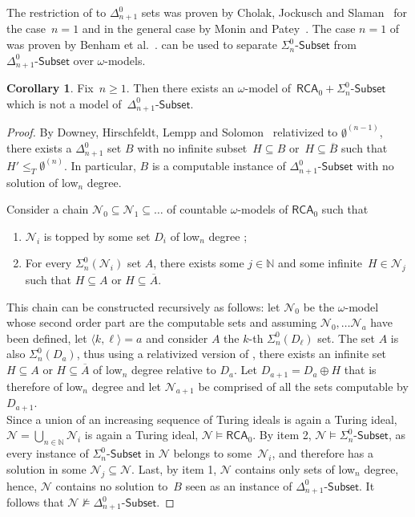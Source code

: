 \documentclass{article}
\def\N{\mathcal{N}}
\def\NN{\mathbb{N}}
\newcommand{\Sub}[1]{{#1}\mbox{-}\mathsf{Subset}}
\newcommand{\RCA}{\mathsf{RCA}}
\numberwithin{theorem}{section}
\theoremstyle{definition}
\newtheorem{corollary}[theorem]{Corollary}
\begin{document}
The restriction of  to $\Delta^0_{n+1}$ sets was proven by Cholak, Jockusch and Slaman~\cite{cholak2001strength} for the case~$n = 1$ and in the general case by Monin and Patey~\cite{monin2021weakness}.
The case $n = 1$ of  was proven by Benham et al.~\cite{benham2024ginsburg}.  can be used to separate $\Sub{\Sigma^0_n}$ from $\Sub{\Delta^0_{n+1}}$ over $\omega$-models.

\begin{corollary}
Fix~$n \geq 1$. Then there exists an $\omega$-model of~$\RCA_0 + \Sub{\Sigma^0_n}$
which is not a model of~$\Sub{\Delta^0_{n+1}}$.
\end{corollary}
\begin{proof}
By Downey, Hirschfeldt, Lempp and Solomon~\cite{downey2001delta2} relativized to $\emptyset^{(n-1)}$,
there exists a $\Delta^0_{n+1}$ set $B$ with no infinite subset~$H \subseteq B$ or~$H \subseteq \overline{B}$ such that $H' \leq_T \emptyset^{(n)}$. In particular, $B$ is a computable instance of $\Sub{\Delta^0_{n+1}}$ with no solution of low${}_n$ degree. 

Consider a chain $\N_0 \subseteq \N_1 \subseteq \dots$ of countable $\omega$-models of $\RCA_0$ such that 
\begin{enumerate} 
    \item $\N_i$ is topped by some set $D_i$ of low${}_n$ degree ; 
    \item For every $\Sigma^0_n(\N_i)$ set $A$, there exists some $j \in \NN$ and some infinite~$H \in \N_j$ such that $H \subseteq A$ or $H \subseteq \overline{A}$.
\end{enumerate}

This chain can be constructed recursively as follows: let $\N_0$ be the $\omega$-model whose second order part are the computable sets and assuming $\N_0, \dots \N_a$ have been defined, let $\langle k,\ell \rangle = a$ and consider $A$ the $k$-th $\Sigma_{n}^0(D_{\ell})$ set. The set $A$ is also $\Sigma_{n}^0(D_{a})$, thus using a relativized version of , there exists an infinite set $H \subseteq A$ or $H \subseteq \overline{A}$ of low${}_{n}$ degree relative to $D_a$. Let $D_{a+1} = D_a \oplus H$ that is therefore of low${}_{n}$ degree and let $\N_{a+1}$ be comprised of all the sets computable by $D_{a+1}$. \\



Since a union of an increasing sequence of Turing ideals is again a Turing ideal, $\N = \bigcup_{n \in \NN} \N_i$ is again a Turing ideal, $\N \models \RCA_0$. By item 2, $\N \models \Sub{\Sigma^0_n}$, as every instance of $\Sub{\Sigma^0_n}$ in $\N$ belongs to some~$\N_i$, and therefore has a solution in some $\N_j \subseteq \N$.
Last, by item 1, $\N$ contains only sets of low${}_n$ degree, hence, $\N$ contains no solution to~$B$ seen as an instance of $\Sub{\Delta^0_{n+1}}$. It follows that $\N \not \models \Sub{\Delta^0_{n+1}}$.
\end{proof}
\bigskip
\end{document}
